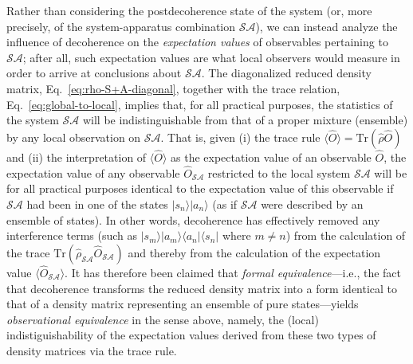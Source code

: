 \documentclass[twocolumn,rmp,aps,amsmath,amsfonts,noshowkeys,noshowpacs]{revtex4}
\newcommand{\ket}[1]{\ensuremath{|{#1\rangle}}}
\newcommand{\bra}[1]{\ensuremath{{\langle #1}|}}
\begin{document}
Rather than considering the postdecoherence state of the system (or,
more precisely, of the system-apparatus combination $\mathcal{SA}$),
we can instead analyze the influence of decoherence on the
\emph{expectation values} of observables pertaining to $\mathcal{SA}$;
after all, such expectation values are what local observers would
measure in order to arrive at conclusions about $\mathcal{SA}$.  The
diagonalized reduced density matrix, Eq.~\eqref{eq:rho-S+A-diagonal},
together with the trace relation, Eq.~\eqref{eq:global-to-local},
implies that, for all practical purposes, the statistics of the system
$\mathcal{SA}$ will be indistinguishable from that of a proper mixture
(ensemble) by any local observation on $\mathcal{SA}$. That is, given
(i) the trace rule $\langle \widehat{O} \rangle =
\text{Tr}(\widehat{\rho}\widehat{O})$ and (ii) the interpretation of
$\langle \widehat{O} \rangle$ as the expectation value of an
observable $\widehat{O}$, the expectation value of any observable
$\widehat{O}_\mathcal{SA}$ restricted to the local system
$\mathcal{SA}$ will be for all practical purposes identical to the
expectation value of this observable if $\mathcal{SA}$ had been in one
of the states $\ket{s_n} \ket{a_n}$ (as if $\mathcal{SA}$ were
described by an ensemble of states).  In other words, decoherence has
effectively removed any interference terms (such as $\ket{s_m}
\ket{a_m} \bra{a_n} \bra{s_n}$ where $m \not= n$) from the calculation
of the trace
$\text{Tr}(\widehat{\rho}_\mathcal{SA}\widehat{O}_\mathcal{SA})$ and
thereby from the calculation of the expectation value $\langle
\widehat{O}_\mathcal{SA} \rangle$.  It has therefore been claimed that
\emph{formal equivalence}---i.e., the fact that decoherence transforms
the reduced density matrix into a form identical to that of a density
matrix representing an ensemble of pure states---yields
\emph{observational equivalence} in the sense above, namely, the
(local) indistiguishability of the expectation values derived from
these two types of density matrices via the trace rule.
\end{document}
